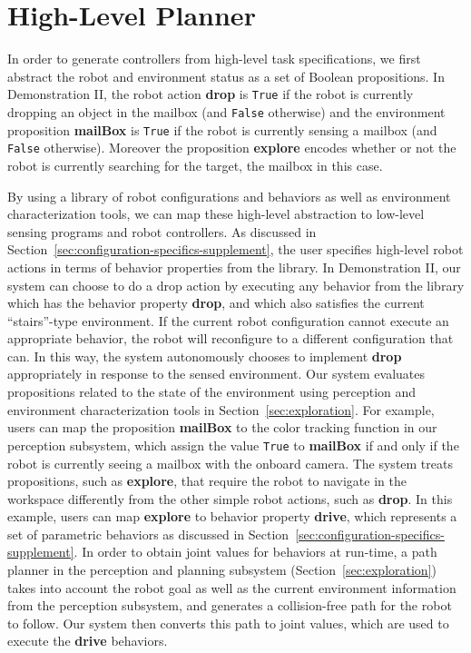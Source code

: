 \documentclass[12pt]{article}
\newcommand{\lt}{{\tt True}}
\newcommand{\lf}{{\tt False}}
\begin{document}
\section{High-Level Planner}
\label{sec:high-level-supplement}

In order to generate controllers from high-level task specifications, we first abstract the robot and environment status as a set of Boolean propositions.
In Demonstration II, the robot action \textbf{drop} is \lt{} if the robot is currently dropping an object in the mailbox (and \lf{} otherwise) and the environment proposition \textbf{mailBox} is \lt{} if the robot is currently sensing a mailbox (and \lf{} otherwise).
Moreover the proposition \textbf{explore} encodes whether or not the robot is currently searching for the target, the mailbox in this case.

By using a library of robot configurations and behaviors as well as environment characterization tools, we can map these high-level abstraction to low-level sensing programs and robot controllers.
As discussed in Section~\ref{sec:configuration-specifics-supplement}, the user specifies high-level robot actions in terms of behavior properties from the library. 
In Demonstration II, our system can choose to do a drop action by executing any behavior from the library which has the behavior property \textbf{drop}, and which also satisfies the current ``stairs''-type environment. If the current robot configuration cannot execute an appropriate behavior, the robot will reconfigure to a different configuration that can.  In this way, the system autonomously chooses to implement  \textbf{drop}  appropriately in response to the sensed environment.
Our system evaluates propositions related to the state of the environment using perception and environment characterization tools in Section~\ref{sec:exploration}. For example, users can map the proposition \textbf{mailBox} to the color tracking function in our perception subsystem, which assign the value \lt{} to \textbf{mailBox} if and only if the robot is currently seeing a mailbox with the onboard camera.
The system treats propositions, such as \textbf{explore}, that require the robot to navigate in the workspace differently from the other simple robot actions, such as \textbf{drop}.
In this example, users can map \textbf{explore} to behavior property \textbf{drive}, which represents a set of parametric behaviors as discussed in Section~\ref{sec:configuration-specifics-supplement}.
In order to obtain joint values for behaviors at run-time, a path planner in the perception and planning subsystem (Section~\ref{sec:exploration}) takes into account the robot goal as well as the current environment information from the perception subsystem, and generates a collision-free path for the robot to follow.
Our system then converts this path to joint values, which are used to execute the \textbf{drive} behaviors.
\end{document}
